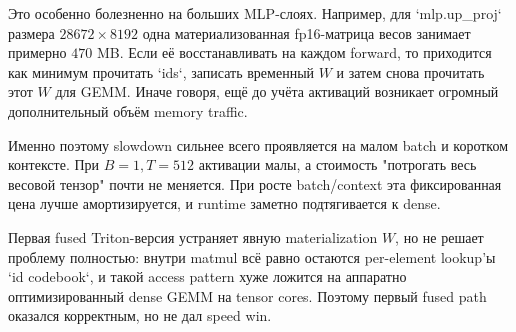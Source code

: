 Это особенно болезненно на больших MLP-слоях. Например, для `mlp.up_proj` размера
$28672 \times 8192$ одна материализованная fp16-матрица весов занимает примерно
$470$ MB. Если её восстанавливать на каждом forward, то приходится как минимум
прочитать `ids`, записать временный $W$ и затем снова прочитать этот $W$ для GEMM.
Иначе говоря, ещё до учёта активаций возникает огромный дополнительный объём
memory traffic.

Именно поэтому slowdown сильнее всего проявляется на малом batch и коротком
контексте. При $B=1, T=512$ активации малы, а стоимость "потрогать весь весовой
тензор" почти не меняется. При росте batch/context эта фиксированная цена лучше
амортизируется, и runtime заметно подтягивается к dense.

Первая fused Triton-версия устраняет явную materialization $W$, но не решает
проблему полностью: внутри matmul всё равно остаются per-element lookup'ы
`id \rightarrow codebook`, и такой access pattern хуже ложится на аппаратно
оптимизированный dense GEMM на tensor cores. Поэтому первый fused path оказался
корректным, но не дал speed win.
